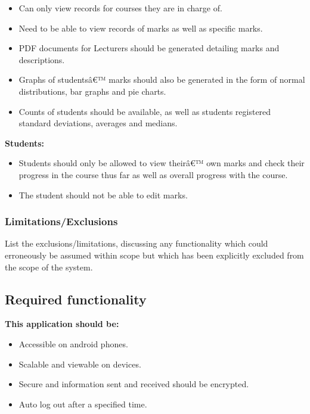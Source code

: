 \documentclass[11pt,a4paper]{article}
\begin{document}
\begin{itemize}
\item Can only view records for courses they are in charge of.
\item Need to be able to view records of marks as well as specific marks.
\item PDF documents for Lecturers should be generated detailing marks and 
descriptions.
\item Graphs of studentsâ€™ marks should also be generated in the form of normal 
distributions, bar graphs and pie charts.
\item Counts of students should be available, as well as students registered standard 
deviations, averages and medians.
\end{itemize}
\textbf{Students:}
\begin{itemize}
\item Students should only be allowed to view theirâ€™ own marks and check their progress in the course thus far as well as overall progress with the course.
\item The student should not be able to edit marks.
\end{itemize}




\subsubsection{Limitations/Exclusions}


List the exclusions/limitations, discussing any functionality which could erroneously be assumed within scope but which has been explicitly excluded from the scope of the system.
\subsection{Required functionality}
\textbf{This application should be:}

\begin{itemize}
\item Accessible on android phones.
\item Scalable and viewable on devices.
\item Secure and information sent and received should be encrypted.
\item Auto log out after a specified time.
\end{itemize}
\end{document}

